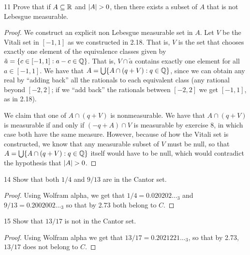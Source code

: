 \begin{exercise}{11}
Prove that if $A \subseteq \mathbb{R}$ and $\left\lvert A\right\rvert > 0$, then there exists a subset of $A$ that is not Lebesgue measurable.
\end{exercise}
\begin{proof}
We construct an explicit non Lebesgue measurable set in $A$.
Let $V$ be the Vitali set in $[-1,1]$ as we constructed in 2.18.
That is, $V$ is the set that chooses exactly one element of the equivalence classes given by $\tilde{a} = \{c \in [-1,1]: a-c \in \mathbb{Q}\}$.
That is, $V \cap\tilde{a}$ contains exactly one element for all $a \in [-1,1]$.
We have that $A = \bigcup \{A \cap (q+V): q\in\mathbb{Q}\}$, since we can obtain any real by ``adding back'' all the rationals to each equivalent class (any rational beyond $[-2,2]$;
if we ``add back'' the rationals between $[-2,2]$ we get $[-1,1]$, as in 2.18).

We claim that one of $A \cap (q+V)$ is nonmeasurable.
We have that $A \cap (q+V)$ is measurable if and only if $(-q+A) \cap V$ is measurable by exercise 8, in which case both have the same measure.
However, because of how the Vitali set is constructed, we know that any measurable subset of $V$ must be null, so that $A = \bigcup \{A \cap (q+V): q\in\mathbb{Q}\}$ itself would have to be null, which would contradict the hypothesis that $\left\lvert A\right\rvert > 0$.
\end{proof} 

\begin{exercise}{14}
Show that both $1/4$ and $9/13$ are in the Cantor set.
\end{exercise}
\begin{proof}
Using Wolfram alpha, we get that $1/4 = 0.020202\dots_3$ and $9/13 = 0.2002002\dots_3$ so that by 2.73 both belong to $C$.
\end{proof} 

\begin{exercise}{15}
Show that $13/17$ is not in the Cantor set.
\end{exercise}
\begin{proof}
Using Wolfram alpha we get that $13/17 = 0.2021221\dots_3$, so that by 2.73, $13/17$ does not belong to $C$.
\end{proof} 

